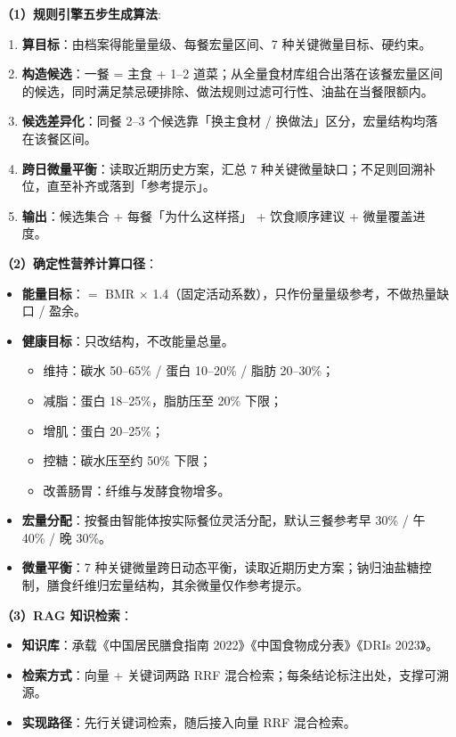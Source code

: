 \documentclass[12pt,a4paper]{ctexart}
\begin{document}
\noindent \textbf{（1）规则引擎五步生成算法}:

\begin{enumerate}
\item \textbf{算目标}：由档案得能量量级、每餐宏量区间、7 种关键微量目标、硬约束。
\item \textbf{构造候选}：一餐 = 主食 + 1--2 道菜；从全量食材库组合出落在该餐宏量区间的候选，同时满足禁忌硬排除、做法规则过滤可行性、油盐在当餐限额内。
\item \textbf{候选差异化}：同餐 2--3 个候选靠「换主食材 / 换做法」区分，宏量结构均落在该餐区间。
\item \textbf{跨日微量平衡}：读取近期历史方案，汇总 7 种关键微量缺口；不足则回溯补位，直至补齐或落到「参考提示」。
\item \textbf{输出}：候选集合 + 每餐「为什么这样搭」 + 饮食顺序建议 + 微量覆盖进度。
\end{enumerate}

\noindent \textbf{（2）确定性营养计算口径}：

\begin{itemize}
  \item \textbf{能量目标}：$=$ BMR $\times$ 1.4（固定活动系数），只作份量量级参考，不做热量缺口 / 盈余。
  \item \textbf{健康目标}：只改结构，不改能量总量。
    \begin{itemize}[leftmargin=1em]
      \item 维持：碳水 50--65\% / 蛋白 10--20\% / 脂肪 20--30\%；
      \item 减脂：蛋白 18--25\%，脂肪压至 20\% 下限；
      \item 增肌：蛋白 20--25\%；
      \item 控糖：碳水压至约 50\% 下限；
      \item 改善肠胃：纤维与发酵食物增多。
    \end{itemize}
  \item \textbf{宏量分配}：按餐由智能体按实际餐位灵活分配，默认三餐参考早 30\% / 午 40\% / 晚 30\%。
  \item \textbf{微量平衡}：7 种关键微量跨日动态平衡，读取近期历史方案；钠归油盐糖控制，膳食纤维归宏量结构，其余微量仅作参考提示。
\end{itemize}

\noindent \textbf{（3）RAG 知识检索}：

\begin{itemize}
  \item \textbf{知识库}：承载《中国居民膳食指南 2022》《中国食物成分表》《DRIs 2023》。
  \item \textbf{检索方式}：向量 + 关键词两路 RRF 混合检索；每条结论标注出处，支撑可溯源。
  \item \textbf{实现路径}：先行关键词检索，随后接入向量 RRF 混合检索。
\end{itemize}
\end{document}
